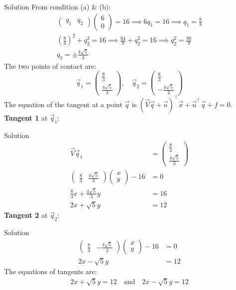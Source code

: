 \documentclass{beamer}
\newcommand{\myvec}[1]{\ensuremath{\begin{pmatrix}#1\end{pmatrix}}}
\providecommand{\brak}[1]{\ensuremath{\left(#1\right)}}
\begin{document}
\begin{frame}{Solution}
From condition (a) \& (b):
\begin{align}
	\myvec{q_1 & q_2}\myvec{6\\0} = 16 \implies 6q_1 = 16 \implies q_1 = \frac{8}{3}\\
	\brak{\frac{8}{3}}^2 + q_2^2 = 16 \implies \frac{64}{9} + q_2^2 = 16 \implies q_2^2 = \frac{80}{9}\\
	q_2 = \pm\frac{4\sqrt{5}}{3}
\end{align}
The two points of contact are:
\begin{equation}
	\vec{q}_1 = \myvec{\frac{8}{3}\\\frac{4\sqrt{5}}{3}}, \quad \vec{q}_2 = \myvec{\frac{8}{3}\\-\frac{4\sqrt{5}}{3}}
\end{equation}
The equation of the tangent at a point $\vec{q}$ is $\brak{\vec{V}\vec{q} + \vec{u}}^\top \vec{x} + \vec{u}^\top \vec{q} + f = 0$.\\
\textbf{Tangent 1} at $\vec{q}_1 $:
\end{frame}

\begin{frame}{Solution}
\begin{align}
	\vec{V}\vec{q}_1 &= \myvec{\frac{8}{3}\\\frac{4\sqrt{5}}{3}}\\
	\myvec{\frac{8}{3} & \frac{4\sqrt{5}}{3}}\myvec{x\\y} - 16 &= 0\\
	\frac{8}{3}x + \frac{4\sqrt{5}}{3}y &= 16\\
	2x + \sqrt{5}y &= 12
\end{align}
\textbf{Tangent 2} at $\vec{q}_2 $:


\end{frame}

\begin{frame}{Solution}
\begin{align}
	\myvec{\frac{8}{3} & -\frac{4\sqrt{5}}{3}}\myvec{x\\y} - 16 &= 0\\
	2x - \sqrt{5}y &= 12
\end{align}
The equations of tangents are:
\begin{align}
	\boxed{2x + \sqrt{5}y = 12 \quad \text{and} \quad 2x - \sqrt{5}y = 12}
\end{align}
\end{frame}
\end{document}
